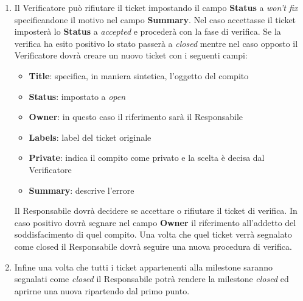 {{\begin{enumerate}
\begin{itemize}
\begin{center}
				VERIFICA \{\emph{Oggetto del compito da verificare}\}
				\end{center}
				\item \textbf{Status}: come in precedenza \`{e} da impostare come \emph{open}
				\item \textbf{Owner}: questa volta sar\`{a} il riferimento del Verificatore proprietario di questo ticket
				\item \textbf{Labels}: si aggiunge al label del ticket originale il suffisso \textbf{V}
				\item \textbf{Private}: indica il compito come privato e la scelta \`{e} lasciata al Responsabile 
				\item \textbf{Summary}: descrizione fatta dal Responsabile
			\end{itemize}
			\item Il Verificatore pu\`{o} rifiutare il ticket impostando il campo \textbf{Status} a \emph{won't fix} specificandone il motivo nel campo \textbf{Summary}. Nel caso accettasse il ticket imposter\`{a} lo \textbf{Status} a \emph{accepted}  e proceder\`{a} con la fase di verifica.
			Se la verifica ha esito positivo lo stato passer\`{a} a \emph{closed} mentre nel caso opposto il Verificatore dovr\`{a} creare un nuovo ticket con i seguenti campi:
			
			\begin{itemize}
				\item \textbf{Title}: specifica, in maniera sintetica, l’oggetto del compito
				\item \textbf{Status}: impostato a \emph{open}
				\item \textbf{Owner}: in questo caso il riferimento sar\`{a} il Responsabile 
				\item \textbf{Labels}: label del ticket originale
				\item \textbf{Private}: indica il compito come privato e la scelta \`{e} decisa dal Verificatore
				\item \textbf{Summary}: descrive l’errore
			\end{itemize}
			Il Responsabile dovr\`{a} decidere se accettare o rifiutare il ticket di verifica. In caso positivo dovr\`{a} segnare nel campo \textbf{Owner} il riferimento all’addetto del soddisfacimento di quel compito. Una volta che quel ticket verr\`{a} segnalato come closed il Responsabile dovr\`{a} seguire una nuova procedura di verifica.
			\item Infine una volta che tutti i ticket appartenenti alla milestone saranno segnalati come \emph{closed} il Responsabile potr\`{a} rendere la milestone \emph{closed} ed aprirne una nuova ripartendo dal primo punto.
		\end{enumerate}

		
	 }
}